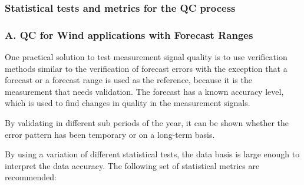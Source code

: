 \subsubsection{Statistical tests and metrics for the QC process}\label{subsubsec:statistical_tests}

{\color{blue}{Comment from COM (21.08.2021): 
There are different methods to test the quality of measurements. 
}}

\subsubsection{A. QC for Wind applications with Forecast Ranges}\label{subsubsec:hist_qc_forecast_ranges}
One practical solution to test measurement signal quality is to use verification methods similar to the verification of forecast errors with the exception that a forecast or a forecast range is used as the reference, because it is the measurement that needs validation. The forecast has a known accuracy level, which is used to find changes in quality in the measurement signals. 

By validating in different sub periods of the year, it can be shown whether the error pattern has been temporary or on a long-term basis. 

By using a variation of different statistical tests, the data basis is large enough to interpret the data accuracy. The following set of statistical metrics are recommended:

